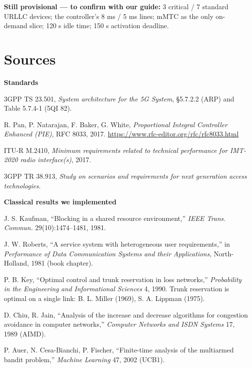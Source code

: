 \documentclass[11pt]{article}
\begin{document}
\textbf{Still provisional — to confirm with our guide:} 3 critical / 7 standard URLLC devices;
the controller's 8 ms / 5 ms lines; mMTC as the only on-demand slice; 120 s idle time; 150 s
activation deadline.

\section{Sources}

{\footnotesize
\textbf{Standards}
\begin{enumerate}[label={[\arabic*]},leftmargin=2.2em]
  \item 3GPP TS 23.501, \emph{System architecture for the 5G System}, §5.7.2.2 (ARP) and Table 5.7.4-1 (5QI 82).
  \item R. Pan, P. Natarajan, F. Baker, G. White, \emph{Proportional Integral Controller Enhanced (PIE)}, RFC 8033, 2017. \url{https://www.rfc-editor.org/rfc/rfc8033.html}
  \item ITU-R M.2410, \emph{Minimum requirements related to technical performance for IMT-2020 radio interface(s)}, 2017.
  \item 3GPP TR 38.913, \emph{Study on scenarios and requirements for next generation access technologies}.
\end{enumerate}
\textbf{Classical results we implemented}
\begin{enumerate}[label={[\arabic*]},leftmargin=2.2em,resume]
  \item J. S. Kaufman, ``Blocking in a shared resource environment,'' \emph{IEEE Trans. Commun.} 29(10):1474--1481, 1981.
  \item J. W. Roberts, ``A service system with heterogeneous user requirements,'' in \emph{Performance of Data Communication Systems and their Applications}, North-Holland, 1981 (book chapter).
  \item P. B. Key, ``Optimal control and trunk reservation in loss networks,'' \emph{Probability in the Engineering and Informational Sciences} 4, 1990. Trunk reservation is optimal on a single link: B. L. Miller (1969), S. A. Lippman (1975).
  \item D. Chiu, R. Jain, ``Analysis of the increase and decrease algorithms for congestion avoidance in computer networks,'' \emph{Computer Networks and ISDN Systems} 17, 1989 (AIMD).
  \item P. Auer, N. Cesa-Bianchi, P. Fischer, ``Finite-time analysis of the multiarmed bandit problem,'' \emph{Machine Learning} 47, 2002 (UCB1).

\end{enumerate}}
\end{document}

